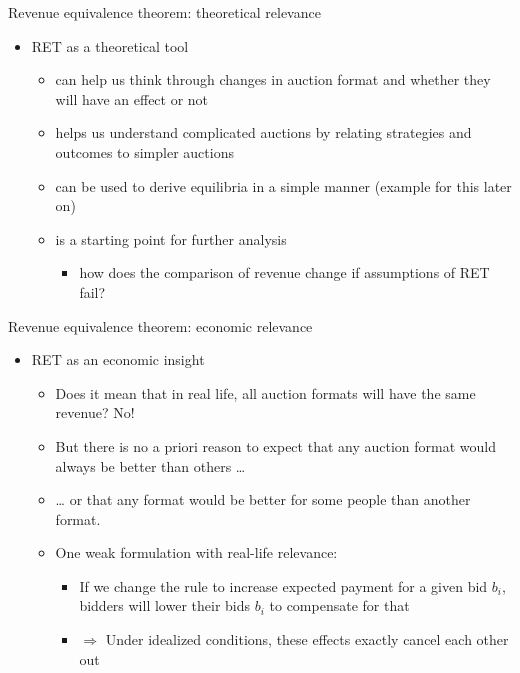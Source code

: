 \documentclass[bigger]{beamer}
\newcommand{\Ra}{\Rightarrow} \newcommand{\ra}{\rightarrow} \newcommand{\Lra}{\Leftrightarrow}
\begin{document}
\begin{frame}[label={sec:org38affd5}]{Revenue equivalence theorem: theoretical relevance}
\begin{itemize}
\item RET as a theoretical tool
\begin{itemize}
\item can help us think through changes in auction format and whether they will have an effect or not
\item helps us understand complicated auctions by relating strategies and outcomes to simpler auctions
\item can be used to derive equilibria in a simple manner (example for this later on)
\item is a starting point for further analysis
\begin{itemize}
\item how does the comparison of revenue change if assumptions of RET fail?
\end{itemize}
\end{itemize}
\end{itemize}
\end{frame}

\begin{frame}[label={sec:org94fb9a8}]{Revenue equivalence theorem: economic relevance}
\begin{itemize}
\item RET as an economic insight
\begin{itemize}
\item Does it mean that in real life, all auction formats will have the same revenue? No!
\item But there is no a priori reason to expect that any auction format would always be better than others \ldots{}
\item \ldots{} or that any format would be better for some people than another format.
\item One weak formulation with real-life relevance:
\begin{itemize}
\item If we change the rule to increase expected payment for a given bid \(b_i\), bidders will lower their bids \(b_i\) to compensate for that
\item \(\Ra\) Under idealized conditions, these effects exactly cancel each other out
\end{itemize}
\end{itemize}
\end{itemize}
\end{frame}
\end{document}
